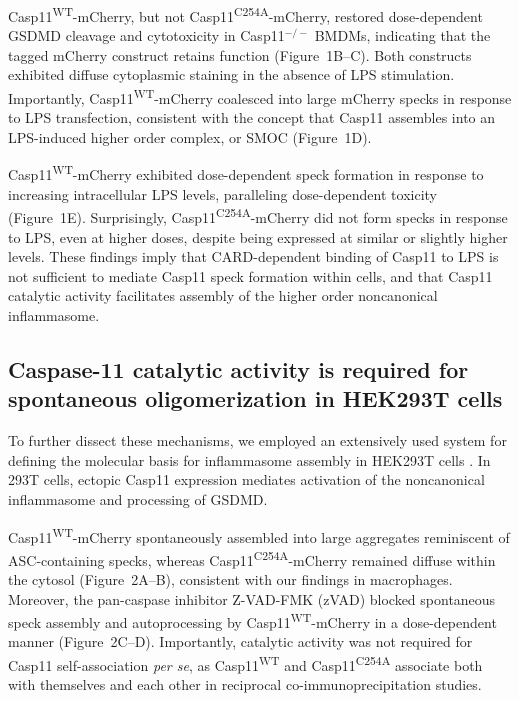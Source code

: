 \documentclass[11pt]{article}
\begin{document}
Casp11\textsuperscript{WT}-mCherry, but not Casp11\textsuperscript{C254A}-mCherry, restored dose-dependent GSDMD cleavage and cytotoxicity in Casp11$^{-/-}$ BMDMs, indicating that the tagged mCherry construct retains function (Figure~1B--C). Both constructs exhibited diffuse cytoplasmic staining in the absence of LPS stimulation. Importantly, Casp11\textsuperscript{WT}-mCherry coalesced into large mCherry specks in response to LPS transfection, consistent with the concept that Casp11 assembles into an LPS-induced higher order complex, or SMOC (Figure~1D).

Casp11\textsuperscript{WT}-mCherry exhibited dose-dependent speck formation in response to increasing intracellular LPS levels, paralleling dose-dependent toxicity (Figure~1E). Surprisingly, Casp11\textsuperscript{C254A}-mCherry did not form specks in response to LPS, even at higher doses, despite being expressed at similar or slightly higher levels. These findings imply that CARD-dependent binding of Casp11 to LPS is not sufficient to mediate Casp11 speck formation within cells, and that Casp11 catalytic activity facilitates assembly of the higher order noncanonical inflammasome.

\subsection{Caspase-11 catalytic activity is required for spontaneous oligomerization in HEK293T cells}

To further dissect these mechanisms, we employed an extensively used system for defining the molecular basis for inflammasome assembly in HEK293T cells \citep{kayagaki2015caspase11,shi2014cytoplasmic}. In 293T cells, ectopic Casp11 expression mediates activation of the noncanonical inflammasome and processing of GSDMD.

Casp11\textsuperscript{WT}-mCherry spontaneously assembled into large aggregates reminiscent of ASC-containing specks, whereas Casp11\textsuperscript{C254A}-mCherry remained diffuse within the cytosol (Figure~2A--B), consistent with our findings in macrophages. Moreover, the pan-caspase inhibitor Z-VAD-FMK (zVAD) blocked spontaneous speck assembly and autoprocessing by Casp11\textsuperscript{WT}-mCherry in a dose-dependent manner (Figure~2C--D). Importantly, catalytic activity was not required for Casp11 self-association \textit{per se}, as Casp11\textsuperscript{WT} and Casp11\textsuperscript{C254A} associate both with themselves and each other in reciprocal co-immunoprecipitation studies.
\end{document}
